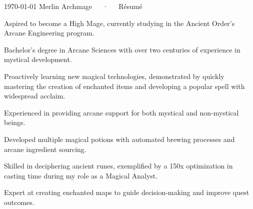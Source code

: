 \documentclass[11pt, a4paper]{awesome-cv}
\begin{document}
\makecvheader[C]
\vspace{2mm}

\makecvfooter
  {\today}
  {Merlin Archmage~~~·~~~Résumé}
  {\thepage}


\newcommand*{\qualstyle}[1]{{\fontsize{10.5pt}{1.2em}\bodyfont\color{graytext} #1}}
\vspace{4mm}
\begin{cvitems}
    
    \item{\qualstyle{Aspired to become a High Mage, currently studying
in the Ancient Order's Arcane Engineering program.}}
    
    \item{\qualstyle{Bachelor's degree in Arcane Sciences with over two
centuries of experience in mystical development.}}
    
    \item{\qualstyle{Proactively learning new magical technologies,
demonstrated by quickly mastering the creation of enchanted items and
developing a popular spell with widespread acclaim.}}
    
    \item{\qualstyle{Experienced in providing arcane support for both
mystical and non-mystical beings.}}
    
    \item{\qualstyle{Developed multiple magical potions with automated
brewing processes and arcane ingredient sourcing.}}
    
    \item{\qualstyle{Skilled in deciphering ancient runes, exemplified
by a 150x optimization in casting time during my role as a Magical
Analyst.}}
    
    \item{\qualstyle{Expert at creating enchanted maps to guide
decision-making and improve quest outcomes.}}

\end{cvitems}
\end{document}
